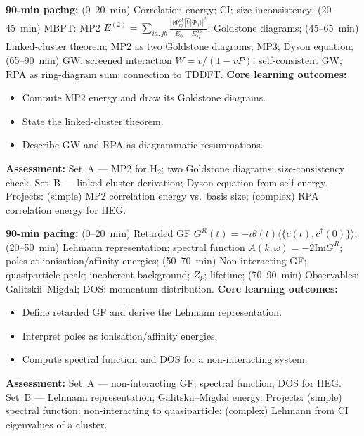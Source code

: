 \documentclass[11pt,a4paper]{article}
\begin{document}
\medskip

\begin{tcolorbox}[modulebox, title={Module~II.4 / L05: Beyond Mean Field --- MP2, Diagrams, and Resummations}]
\textbf{90-min pacing:} (0--20~min) Correlation energy; CI; size inconsistency; (20--45~min) MBPT: MP2 $E^{(2)}=\sum_{ia,jb}\tfrac{|\langle\Phi_{ij}^{ab}|\hat{V}|\Phi_0\rangle|^2}{E_0-E_{ij}^{ab}}$; Goldstone diagrams; (45--65~min) Linked-cluster theorem; MP2 as two Goldstone diagrams; MP3; Dyson equation; (65--90~min) GW: screened interaction $W=v/(1-vP)$; self-consistent GW; RPA as ring-diagram sum; connection to TDDFT.
\medskip\textbf{Core learning outcomes:}
\begin{itemize}[leftmargin=1.4em,topsep=2pt,itemsep=1pt]
  \item Compute MP2 energy and draw its Goldstone diagrams.
  \item State the linked-cluster theorem.
  \item Describe GW and RPA as diagrammatic resummations.
\end{itemize}
\medskip\textbf{Assessment:}
Set~A --- MP2 for H$_2$; two Goldstone diagrams; size-consistency check.
Set~B --- linked-cluster derivation; Dyson equation from self-energy.
Projects: (simple) MP2 correlation energy vs.\ basis size; (complex) RPA correlation energy for HEG.
\end{tcolorbox}

\medskip

\begin{tcolorbox}[modulebox, title={Module~II.4 / L06: Green's Functions I}]
\textbf{90-min pacing:} (0--20~min) Retarded GF $G^R(t)=-i\theta(t)\langle\{\hat{c}(t),\hat{c}^\dagger(0)\}\rangle$; (20--50~min) Lehmann representation; spectral function $A(k,\omega)=-2\text{Im}G^R$; poles at ionisation/affinity energies; (50--70~min) Non-interacting GF; quasiparticle peak; incoherent background; $Z_k$; lifetime; (70--90~min) Observables: Galitskii--Migdal; DOS; momentum distribution.
\medskip\textbf{Core learning outcomes:}
\begin{itemize}[leftmargin=1.4em,topsep=2pt,itemsep=1pt]
  \item Define retarded GF and derive the Lehmann representation.
  \item Interpret poles as ionisation/affinity energies.
  \item Compute spectral function and DOS for a non-interacting system.
\end{itemize}
\medskip\textbf{Assessment:}
Set~A --- non-interacting GF; spectral function; DOS for HEG.
Set~B --- Lehmann representation; Galitskii--Migdal energy.
Projects: (simple) spectral function: non-interacting to quasiparticle; (complex) Lehmann from CI eigenvalues of a cluster.
\end{tcolorbox}
\end{document}
